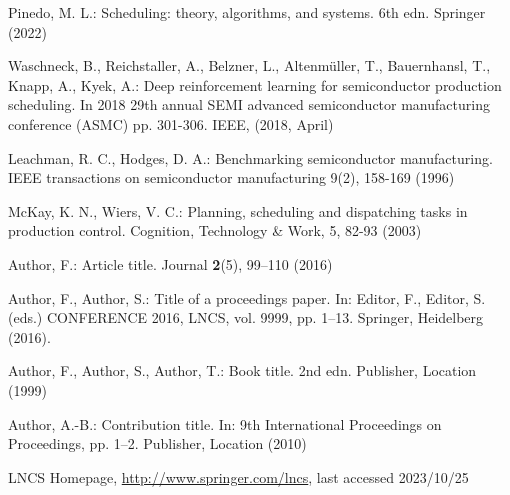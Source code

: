 \documentclass[runningheads]{llncs}
\begin{document}
\begin{thebibliography}{8}
Pinedo, M. L.: Scheduling: theory, algorithms, and systems. 6th edn. Springer (2022) 

Waschneck, B., Reichstaller, A., Belzner, L., Altenmüller, T., Bauernhansl, T., Knapp, A., Kyek, A.: Deep reinforcement learning for semiconductor production scheduling. In 2018 29th annual SEMI advanced semiconductor manufacturing conference (ASMC) pp. 301-306. IEEE, (2018, April)

Leachman, R. C., Hodges, D. A.: Benchmarking semiconductor manufacturing. IEEE transactions on semiconductor manufacturing 9(2), 158-169 (1996)

McKay, K. N., Wiers, V. C.: Planning, scheduling and dispatching tasks in production control. Cognition, Technology \& Work, 5, 82-93 (2003)

Author, F.: Article title. Journal \textbf{2}(5), 99--110 (2016)

Author, F., Author, S.: Title of a proceedings paper. In: Editor,
F., Editor, S. (eds.) CONFERENCE 2016, LNCS, vol. 9999, pp. 1--13.
Springer, Heidelberg (2016). 

Author, F., Author, S., Author, T.: Book title. 2nd edn. Publisher,
Location (1999)

Author, A.-B.: Contribution title. In: 9th International Proceedings
on Proceedings, pp. 1--2. Publisher, Location (2010)

LNCS Homepage, \url{http://www.springer.com/lncs}, last accessed 2023/10/25
\end{thebibliography}
\end{document}
